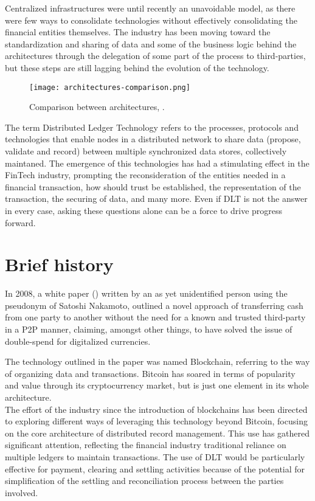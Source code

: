 Centralized infrastructures were until recently an unavoidable model, as there were few ways to consolidate technologies without effectively consolidating the financial entities themselves. The industry has been moving toward the standardization and sharing of data and some of the business logic behind the architectures through the delegation of some part of the process to third-parties, but these steps are still lagging behind the evolution of the technology. \\

\begin{figure}[t]
    \centering
    \texttt{[image: architectures-comparison.png]}
    \caption{
        Comparison between architectures, \cite{cordawhitepaper}. 
        }
\end{figure}


The term Distributed Ledger Technology refers to the processes, protocols and technologies that enable nodes in a distributed network to share data (propose, validate and record) between multiple synchronized data stores, collectively maintaned. The emergence of this technologies has had a stimulating effect in the FinTech industry, prompting the reconsideration of the entities needed in a financial transaction, how should trust be established, the representation of the transaction, the securing of data, and many more. Even if DLT is not the answer in every case, asking these questions alone can be a force to drive progress forward.

\section{Brief history}
In 2008, a white paper (\cite{bitcoinpaper}) written by an as yet unidentified person using the pseudonym of Satoshi Nakamoto, outlined a novel approach of transferring cash from one party to another without the need for a known and trusted third-party in a P2P manner, claiming, amongst other things, to have solved the issue of double-spend for digitalized currencies. 


The technology outlined in the paper was named Blockchain, referring to the way of organizing data and transactions. Bitcoin has soared in terms of popularity and value through its cryptocurrency market, but is just one element in its whole architecture. \\

The effort of the industry since the introduction of blockchains has been directed to exploring different ways of leveraging this technology beyond Bitcoin, focusing on the core architecture of distributed record management. This use has gathered significant attention, reflecting the financial industry traditional reliance on multiple ledgers to maintain transactions. The use of DLT would be particularly effective for payment, clearing and settling activities because of the potential for simplification of the settling and reconciliation process between the parties involved. \\

